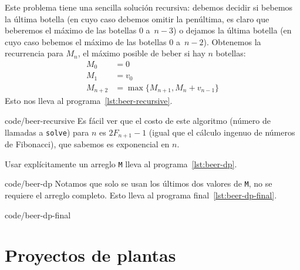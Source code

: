   Este problema tiene una sencilla solución recursiva:
  debemos decidir si bebemos la última botella
  (en cuyo caso debemos omitir la penúltima,
   es claro que beberemos el máximo de las botellas \num{0} a~\(n - 3\))
  o dejamos la última botella
  (en cuyo caso bebemos el máximo de las botellas \num{0} a~\(n - 2\)).
  Obtenemos la recurrencia para \(M_n\),
  el máximo posible de beber si hay \(n\) botellas:
  \begin{align*}
    M_0
      &= 0 \\
    M_1
      &= v_0 \\
    M_{n + 2}
      &= \max \{ M_{n + 1}, M_n + v_{n - 1} \}
  \end{align*}
  Esto nos lleva al programa~\ref{lst:beer-recursive}.
  
		  {code/beer-recursive}
  Es fácil ver que el costo de este algoritmo
  (número de llamadas a \lstinline[language = Python]!solve!)
  para \(n\) es \(2 F_{n + 1} - 1\)
  (igual que el cálculo ingenuo de números de Fibonacci),
  que sabemos es exponencial en \(n\).

  Usar explícitamente un arreglo \lstinline[language = Python]!M!
  lleva al programa~\ref{lst:beer-dp}.
  
		  {code/beer-dp}
  Notamos que solo se usan los últimos dos valores
  de \lstinline[language = Python]!M!,
  no se requiere el arreglo completo.
  Esto lleva al programa final~\ref{lst:beer-dp-final}.
  
		  {code/beer-dp-final}

\section{Proyectos de plantas}
\label{sec:proyectos-plantas}

